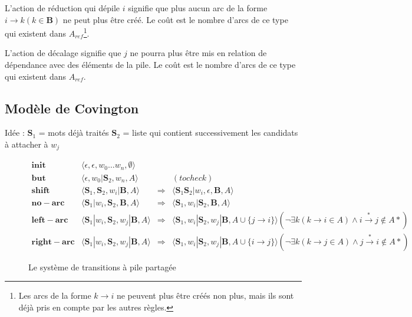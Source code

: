 \documentclass[11pt,openany]{book}
\begin{document}
L'action de réduction qui dépile $i$ signifie que plus aucun arc de la
forme $i\rightarrow k (k \in \mathbf{B})$ ne peut plus être créé. 
Le coût est le nombre d'arcs de ce type qui existent dans
$A_{ref}$\footnote{Les arcs de la forme $k\rightarrow i$ ne peuvent
  plus être créés non plus, mais ils sont déjà pris en compte par les
  autres règles.}.

L'action de décalage signifie que $j$ ne pourra plus être mis en
relation de dépendance avec des éléments de la pile. Le coût est le
nombre d'arcs de ce type qui existent dans $A_{ref}$.



\subsection{Modèle de Covington}

Idée : $\mathbf{S}_1$ = mots déjà traités
$\mathbf{S}_2$ = liste qui contient successivement les candidats à
attacher à $w_j$


\begin{figure}[htbp]
\begin{displaymath}
\begin{array}{rccll}
\mathbf{init}  &\langle \epsilon , \epsilon , w_0 \ldots w_n ,\emptyset \rangle\\
\mathbf{but}  & \langle \epsilon , w_0|\mathbf{S}_2 , w_n, A \rangle && (to check)\\
\mathbf{shift} & \langle \mathbf{S}_1, \mathbf{S}_2 ,  w_i | \mathbf{B} , A   \rangle
&\Rightarrow &\langle  \mathbf{S}_1\mathbf{S}_2 | w_i , \epsilon ,
\mathbf{B} , A   \rangle\\

\mathbf{no-arc}& \langle \mathbf{S}_1 | w_i , \mathbf{S}_2 , \mathbf{B} , A \rangle 
&\Rightarrow &\langle \mathbf{S}_1 ,  w_i |\mathbf{S}_2 ,\mathbf{B} , A\rangle \\

\mathbf{left-arc}& \langle \mathbf{S}_1 | w_i , \mathbf{S}_2 , w_j | \mathbf{B} , A \rangle 
&\Rightarrow &\langle \mathbf{S}_1 ,  w_i |\mathbf{S}_2 ,w_j|\mathbf{B} ,
A \cup \{j\rightarrow i\}\rangle  
(\lnot\exists k (k\rightarrow i  \in A) \land i \stackrel{*}{\rightarrow } j \not\in A*) \\

\mathbf{right-arc}& \langle \mathbf{S}_1 | w_i , \mathbf{S}_2 , w_j | \mathbf{B} , A \rangle 
&\Rightarrow &\langle \mathbf{S}_1 ,  w_i |\mathbf{S}_2 ,w_j|\mathbf{B} ,
A \cup \{i\rightarrow j\}\rangle 
(\lnot\exists k (k\rightarrow j  \in A) \land j \stackrel{*}{\rightarrow } i \not\in A*)
\end{array}
\end{displaymath}
\caption{\label{fig-covington}Le système de transitions à pile partagée}
\end{figure}
\end{document}
